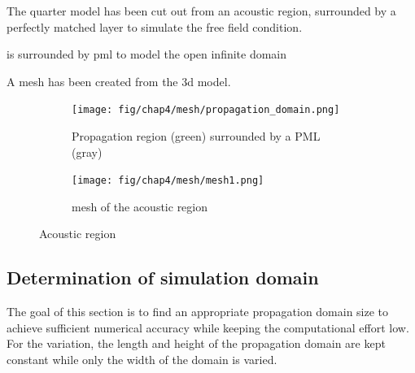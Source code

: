 The quarter model has been cut out from an acoustic region, surrounded by a perfectly matched layer to simulate the free field condition.

is surrounded by pml to model the open infinite domain

A mesh has been created from the 3d model.

\begin{figure}[H]
	\centering
	\begin{subfigure}[b]{0.45\textwidth}
		\centering
		\texttt{[image: fig/chap4/mesh/propagation\_domain.png]}
		\caption{Propagation region (green) surrounded by a PML (gray)}
		\label{fig:propagation_domain}
	\end{subfigure}
	\hfill
	\begin{subfigure}[b]{0.45\textwidth}
		\centering
		\texttt{[image: fig/chap4/mesh/mesh1.png]}
		\caption{mesh of the acoustic region}
		\label{fig:mesh_model}
	\end{subfigure}
	\caption{Acoustic region}
\end{figure}




\subsection*{Determination of simulation domain}

The goal of this section is to find an appropriate propagation domain size to achieve sufficient numerical accuracy while keeping the computational effort low. For the variation, the length and height of the propagation domain are kept constant while only the width of the domain is varied.

